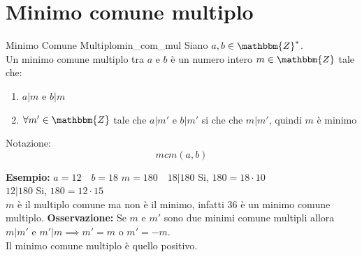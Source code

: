 \documentclass[12pt, letterpaper]{report}
\newcounter{definition}
\newcommand{\nmu}{}
\begin{document}
		\section{Minimo comune multiplo}
		\begin{definition}{\nmu Minimo Comune Multiplo}{min_com_mul}
			Siano $a,b \in \mathbbm{Z}^*$.\\
			Un minimo comune multiplo tra $a$ e $b$ è un numero intero $m \in \mathbbm{Z}$ tale che:
			\begin{enumerate}
				\item $a|m$ e $b|m$
				\item $\forall m' \in \mathbbm{Z}$ tale che $a|m'$ e $b|m'$ si che che $m|m'$, quindi $m$ è minimo
			\end{enumerate}
			Notazione:
			\[
			mcm(a,b)
			\]
		\end{definition}
		\textbf{Esempio:} $a = 12 \quad b = 18$
		$m = 180 \quad 18 | 180$ Si, $180 = 18 \cdot 10$ \\
		$12 |180$ Si, $180 = 12 \cdot 15$ \\
		$m$ è il multiplo comune ma non è il minimo, infatti 36 è un minimo comune multiplo.
		\textbf{Osservazione:} Se $m$ e $m'$ sono due minimi comune multipli allora $m|m'$ e $m'|m \implies m' = m$ o $m' = -m$. \\
		Il minimo comune multiplo è quello positivo. \\
\end{document}
